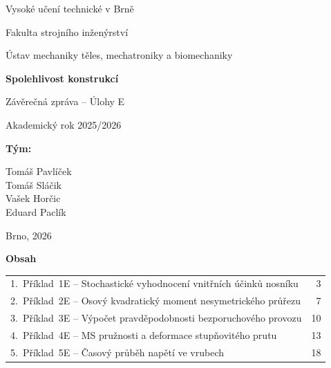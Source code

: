 \documentclass[a4paper,11pt]{article}
\begin{document}
\begin{titlepage}
    \centering
    \vspace*{1.5cm}
    {\large Vysoké učení technické v Brně\par}
    {\large Fakulta strojního inženýrství\par}
    {\large Ústav mechaniky těles, mechatroniky a biomechaniky\par}
    \vspace{3cm}

    {\Huge\bfseries Spolehlivost konstrukcí\par}
    \vspace{0.8cm}
    {\LARGE Závěrečná zpráva -- Úlohy E\par}
    \vspace{0.5cm}
    {\large Akademický rok 2025/2026\par}

    \vspace{3cm}
    {\large\bfseries Tým:\par}
    \vspace{0.4cm}
    {\large
        Tomáš Pavlíček\\[2pt]
        Tomáš Sláčik\\[2pt]
        Vašek Horčic\\[2pt]
        Eduard Paclík\par
    }

    \vfill
    {\large Brno, 2026\par}
\end{titlepage}

\thispagestyle{empty}

\vspace*{2cm}
\begin{center}
{\Huge\bfseries Obsah\par}
\end{center}
\vspace{1.5cm}

{\large
\begin{tabular}{@{}p{}@{\hfill}r@{}}
1.~Příklad~1E -- Stochastické vyhodnocení vnitřních účinků nosníku & 3 \\[0.6em]
2.~Příklad~2E -- Osový kvadratický moment nesymetrického průřezu & 7 \\[0.6em]
3.~Příklad~3E -- Výpočet pravděpodobnosti bezporuchového provozu & 10 \\[0.6em]
4.~Příklad~4E -- MS pružnosti a deformace stupňovitého prutu & 13 \\[0.6em]
5.~Příklad~5E -- Časový průběh napětí ve vrubech & 18 \\
\end{tabular}
}
\end{document}
